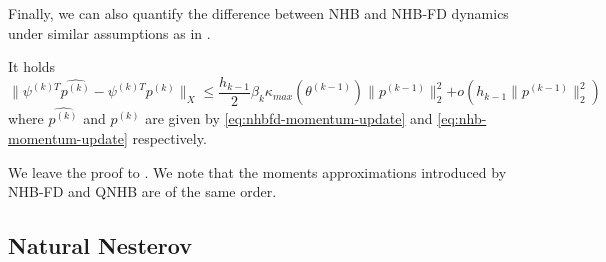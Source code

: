 \documentclass{article}
\theoremstyle{noparens}
\newcommand{\paramkm}{\theta^{(k-1)}}
\newcommand{\psikT}{\psi^{(k)T}}
\newcommand{\pk}{p^{(k)}}
\newcommand{\pkm}{p^{(k-1)}}
\begin{document}
Finally, we can also quantify the difference between NHB and NHB-FD dynamics under similar assumptions as in .
\begin{proposition}
\label{prop:qnhb-bis}
It holds
$$
\|\psikT \widehat{\pk}-\psikT \pk\|_X\leq \frac{h_{k-1}}{2} \beta_k \kappa_{max}(\paramkm) \|\pkm\|_2^2 { + o(h_{k-1}\|\pkm\|_2^2)}
$$
where   $\widehat{\pk}$ and  $\pk$ are given by \eqref{eq:nhbfd-momentum-update} and \eqref{eq:nhb-momentum-update} respectively.
\end{proposition}
We leave the proof to . We note that the moments approximations introduced by NHB-FD and QNHB are of the same order.































\subsection{Natural Nesterov}
\label{sec:nesterov}
\end{document}
